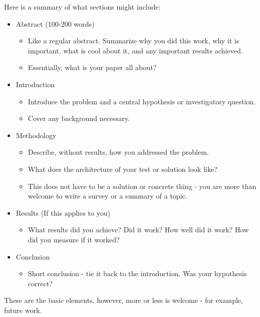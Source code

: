 \documentclass[12pt]{article}
\begin{document}
Here is a summary of what sections might include:
\begin{itemize}[noitemsep]
    \item Abstract (100-200 words)
    \begin{itemize}
        \item Like a regular abstract. Summarize why you did this work, why it is important, what is cool about it, and any important results achieved. 
        \item Essentially, what is your paper all about?
    \end{itemize}
    \item Introduction
    \begin{itemize}
        \item Introduce the problem and a central hypothesis or investigatory question.
        \item Cover any background necessary.
    \end{itemize}
    \item Methodology
    \begin{itemize}
        \item Describe, without results, how you addressed the problem.
        \item What does the architecture of your test or solution look like?
        \item This does not have to be a solution or concrete thing - you are more than welcome to write a survey or a summary of a topic. 
    \end{itemize}
    \item{Results (If this applies to you)}
    \begin{itemize}
        \item What results did you achieve? Did it work? How well did it work? How did you measure if it worked? 
    \end{itemize}
    \item{Conclusion}
    \begin{itemize}
        \item Short conclusion - tie it back to the introduction. Was your hypothesis correct? 
    \end{itemize}
\end{itemize}

These are the basic elements, however, more or less is welcome - for example, future work. 
\end{document}
